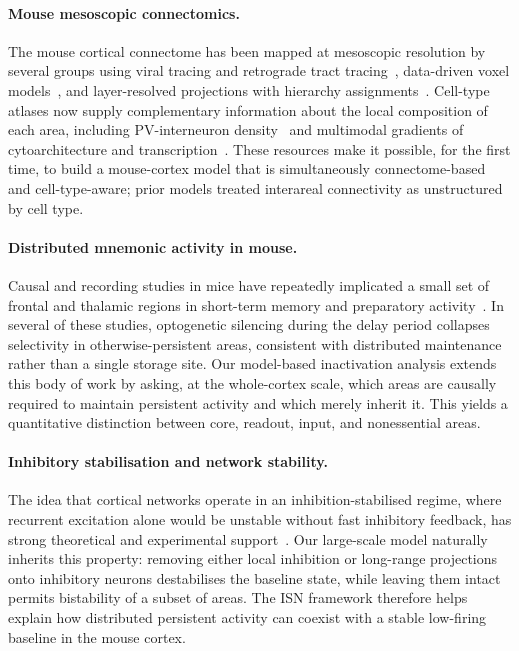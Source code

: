 \paragraph{Mouse mesoscopic connectomics.}
The mouse cortical connectome has been mapped at mesoscopic resolution by several groups using viral tracing and retrograde tract tracing~\cite{oh2014mesoscale,gamanut2018mouse}, data-driven voxel models~\cite{knox2018highresolution}, and layer-resolved projections with hierarchy assignments~\cite{harris2019hierarchical}. Cell-type atlases now supply complementary information about the local composition of each area, including PV-interneuron density~\cite{kim2017braintype} and multimodal gradients of cytoarchitecture and transcription~\cite{fulcher2019overlapping}. These resources make it possible, for the first time, to build a mouse-cortex model that is simultaneously connectome-based and cell-type-aware; prior models treated interareal connectivity as unstructured by cell type.

\paragraph{Distributed mnemonic activity in mouse.}
Causal and recording studies in mice have repeatedly implicated a small set of frontal and thalamic regions in short-term memory and preparatory activity~\cite{guo2017maintenance,inagaki2019discrete,bolkan2017thalamic,schmitt2017thalamic,gilad2018behavioral}. In several of these studies, optogenetic silencing during the delay period collapses selectivity in otherwise-persistent areas, consistent with distributed maintenance rather than a single storage site. Our model-based inactivation analysis extends this body of work by asking, at the whole-cortex scale, which areas are causally required to maintain persistent activity and which merely inherit it. This yields a quantitative distinction between core, readout, input, and nonessential areas.

\paragraph{Inhibitory stabilisation and network stability.}
The idea that cortical networks operate in an inhibition-stabilised regime, where recurrent excitation alone would be unstable without fast inhibitory feedback, has strong theoretical and experimental support~\cite{tsodyks1997paradoxical,sanzeni2020inhibition}. Our large-scale model naturally inherits this property: removing either local inhibition or long-range projections onto inhibitory neurons destabilises the baseline state, while leaving them intact permits bistability of a subset of areas. The ISN framework therefore helps explain how distributed persistent activity can coexist with a stable low-firing baseline in the mouse cortex.

